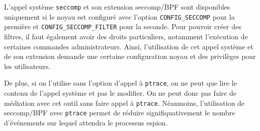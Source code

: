 L'appel système \texttt{seccomp} et son extension seccomp/BPF sont disponibles uniquement si
le noyau est configuré avec l'option \texttt{CONFIG\_SECCOMP} pour la première
et \texttt{CONFIG\_SECCOMP\_FILTER} pour la seconde. Pour pouvoir créer des
filtres, il faut également avoir des droits particuliers, notamment l'exécution
de certaines commandes administrateurs. Ainsi, l'utilisation de cet appel
système et de son extension demande une certaine configuration noyau et des
privilèges pour les utilisateurs.

De plus, si on l'utilise sans l'option d'appel à \texttt{ptrace}, on ne peut que
lire le contenu de l'appel système et pas le modifier. On ne peut donc pas faire
de médiation avec cet outil sans faire appel à \texttt{ptrace}. Néanmoins,
l'utilisation de seccomp/BPF avec \texttt{ptrace} permet de réduire
signifiquativement le nombre d'événements sur lequel attendra le processus
espion.

